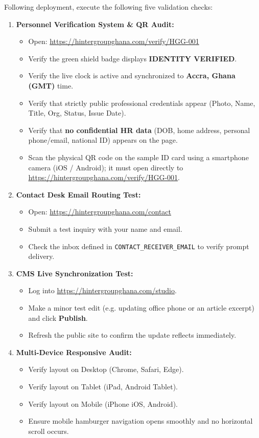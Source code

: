 \documentclass[11pt,a4paper,oneside]{book}
\begin{document}
Following deployment, execute the following five validation checks:
\begin{enumerate}[leftmargin=*,label=\textbf{\arabic*.}]
  \item \textbf{Personnel Verification System \& QR Audit:}
    \begin{itemize}
      \item Open: \url{https://hintergroupghana.com/verify/HGG-001}
      \item Verify the green shield badge displays \textbf{IDENTITY VERIFIED}.
      \item Verify the live clock is active and synchronized to \textbf{Accra, Ghana (GMT)} time.
      \item Verify that strictly public professional credentials appear (Photo, Name, Title, Org, Status, Issue Date).
      \item Verify that \textbf{no confidential HR data} (DOB, home address, personal phone/email, national ID) appears on the page.
      \item Scan the physical QR code on the sample ID card using a smartphone camera (iOS / Android); it must open directly to \url{https://hintergroupghana.com/verify/HGG-001}.
    \end{itemize}

  \item \textbf{Contact Desk Email Routing Test:}
    \begin{itemize}
      \item Open: \url{https://hintergroupghana.com/contact}
      \item Submit a test inquiry with your name and email.
      \item Check the inbox defined in \texttt{CONTACT\_RECEIVER\_EMAIL} to verify prompt delivery.
    \end{itemize}

  \item \textbf{CMS Live Synchronization Test:}
    \begin{itemize}
      \item Log into \url{https://hintergroupghana.com/studio}.
      \item Make a minor test edit (e.g. updating office phone or an article excerpt) and click \textbf{Publish}.
      \item Refresh the public site to confirm the update reflects immediately.
    \end{itemize}

  \item \textbf{Multi-Device Responsive Audit:}
    \begin{itemize}
      \item Verify layout on Desktop (Chrome, Safari, Edge).
      \item Verify layout on Tablet (iPad, Android Tablet).
      \item Verify layout on Mobile (iPhone iOS, Android).
      \item Ensure mobile hamburger navigation opens smoothly and no horizontal scroll occurs.
    \end{itemize}


\end{enumerate}
\end{document}
